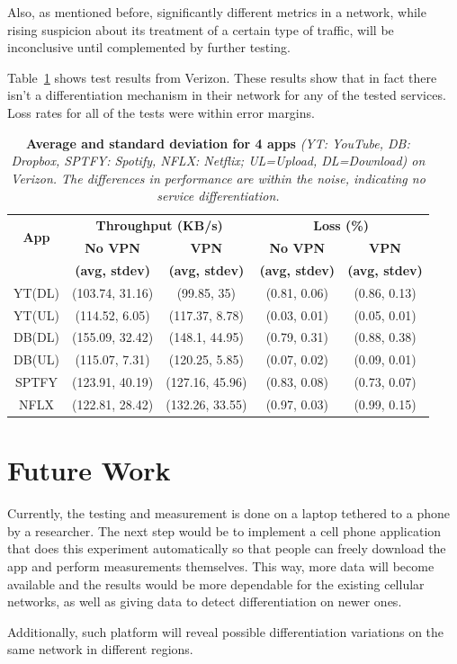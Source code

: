 \documentclass[letterpaper]{sig-alternate-10pt}
\begin{document}
Also, as mentioned before, significantly different metrics in a network, while rising suspicion about its treatment of a certain type of traffic, will be inconclusive until complemented by further testing.

Table~\ref{tab:svcdiff} shows test results from Verizon. These results show that in fact there isn't a differentiation mechanism in their network for any of the tested services. Loss rates for all of the tests were within error margins.
\begin{table}
\centering
\begin{small}
\setlength{\tabcolsep}{.01em}
\begin{tabular}{|c|c|c|c|c|}
\hline
\multirow{2}{*}{\bf App}&\multicolumn{2}{c|}{\bf Throughput (KB/s)}& \multicolumn{2}{c|}{\bf Loss (\%)} \tabularnewline
\cline{2-5}
                             &{\bf No VPN} &{\bf VPN}&{\bf No VPN}&{\bf VPN}   \tabularnewline
                             &{\bf (avg, stdev)} &{\bf (avg, stdev)}&{\bf (avg, stdev)}&{\bf (avg, stdev)}   \tabularnewline
\hline

YT(DL)&(103.74, 31.16)&(99.85, 35)&(0.81, 0.06)&(0.86, 0.13) \tabularnewline
\hline
YT(UL)&(114.52, 6.05)&(117.37, 8.78)&(0.03, 0.01)&(0.05, 0.01) \tabularnewline
\hline
DB(DL) &(155.09, 32.42)&(148.1, 44.95)&(0.79, 0.31)&(0.88, 0.38) \tabularnewline
\hline
DB(UL)&(115.07, 7.31)&(120.25, 5.85)&(0.07, 0.02)&(0.09, 0.01) \tabularnewline
\hline
SPTFY&(123.91, 40.19)&(127.16, 45.96)&(0.83, 0.08)&(0.73, 0.07) \tabularnewline
\hline
NFLX&(122.81, 28.42)&(132.26, 33.55)&(0.97, 0.03)&(0.99, 0.15) \tabularnewline
\hline
\end{tabular}
\end{small}
\caption{ \textbf{Average and standard deviation for 4  apps } \emph{(YT: YouTube, DB: Dropbox, SPTFY: Spotify, NFLX: Netflix; UL=Upload, DL=Download) on 
Verizon. The differences in performance are within the noise, indicating no service differentiation. }}
\label{tab:svcdiff}
\end{table}

\section{Future Work}

Currently, the testing and measurement is done on a laptop tethered to a phone by a researcher. The next step would be to implement a cell phone application that does this experiment automatically so that people can freely download the app and perform measurements themselves. This way, more data will become available and the results would be more dependable for the existing cellular networks, as well as giving data to detect differentiation on newer ones.

Additionally, such platform will reveal possible differentiation variations on the same network in different regions.

\begin{small}

\end{small}
\end{document}

